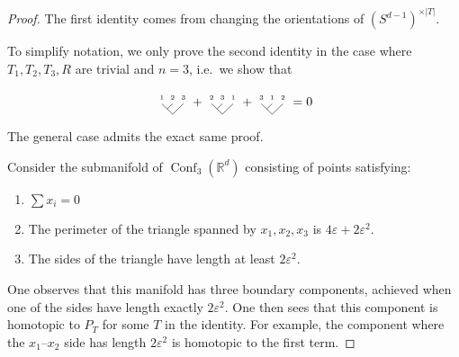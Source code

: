 \documentclass{shortart}
\theoremstyle{definition}
\DeclareMathOperator\Conf{Conf}
\newcommand\R{\mathbb{R}}
\begin{document}
\begin{proof}
  The first identity comes from changing the orientations of $(S^{d - 1})^{\times |T|}$.

  To simplify notation, we only prove the second identity in the case where $T_1, T_2, T_3, R$ are trivial and $n = 3$, i.e.\ we show that
  \begin{useimager}
    \[
      \begin{tikzpicture}[scale=0.3, baseline={([yshift=-.5ex]current bounding box.center)}]
        \draw (0, 0) -- (-1, 1) node [above=-0.05] {\tiny 1};
        \draw (-0.5, 0.5) -- (0, 1) node [above=-0.05] {\tiny 2};
        \draw (0, 0) -- (1, 1) node [above=-0.05] {\tiny 3};
      \end{tikzpicture}
      +
      \begin{tikzpicture}[scale=0.3, baseline={([yshift=-.5ex]current bounding box.center)}]
        \draw (0, 0) -- (-1, 1) node [above=-0.05] {\tiny 2};
        \draw (-0.5, 0.5) -- (0, 1) node [above=-0.05] {\tiny 3};
        \draw (0, 0) -- (1, 1) node [above=-0.05] {\tiny 1};
      \end{tikzpicture}
      +
      \begin{tikzpicture}[scale=0.3, baseline={([yshift=-.5ex]current bounding box.center)}]
        \draw (0, 0) -- (-1, 1) node [above=-0.05] {\tiny 3};
        \draw (-0.5, 0.5) -- (0, 1) node [above=-0.05] {\tiny 1};
        \draw (0, 0) -- (1, 1) node [above=-0.05] {\tiny 2};
      \end{tikzpicture}
      = 0
    \]
  \end{useimager}
  The general case admits the exact same proof.

  Consider the submanifold of $\Conf_3(\R^d)$ consisting of points satisfying:
  \begin{enumerate}
    \item $\sum x_i = 0$
    \item The perimeter of the triangle spanned by $x_1, x_2, x_3$ is $4\varepsilon + 2 \varepsilon^2$.
    \item The sides of the triangle have length at least $2\varepsilon^2$.
  \end{enumerate}
  One observes that this manifold has three boundary components, achieved when one of the sides have length exactly $2 \varepsilon^2$. One then sees that this component is homotopic to $P_T$ for some $T$ in the identity. For example, the component where the $x_1$--$x_2$ side has length $2 \varepsilon^2$ is homotopic to the first term.
\end{proof}
\end{document}

